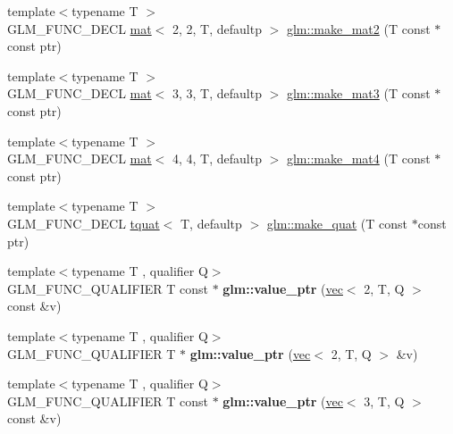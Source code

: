 \begin{DoxyCompactItemize}
\item 
{\footnotesize template$<$typename T $>$ }\\G\+L\+M\+\_\+\+F\+U\+N\+C\+\_\+\+D\+E\+CL \hyperlink{structglm_1_1mat}{mat}$<$ 2, 2, T, defaultp $>$ \hyperlink{group__gtc__type__ptr_ga04409e74dc3da251d2501acf5b4b546c}{glm\+::make\+\_\+mat2} (T const $\ast$const ptr)
\item 
{\footnotesize template$<$typename T $>$ }\\G\+L\+M\+\_\+\+F\+U\+N\+C\+\_\+\+D\+E\+CL \hyperlink{structglm_1_1mat}{mat}$<$ 3, 3, T, defaultp $>$ \hyperlink{group__gtc__type__ptr_ga611ee7c4d4cadfc83a8fa8e1d10a170f}{glm\+::make\+\_\+mat3} (T const $\ast$const ptr)
\item 
{\footnotesize template$<$typename T $>$ }\\G\+L\+M\+\_\+\+F\+U\+N\+C\+\_\+\+D\+E\+CL \hyperlink{structglm_1_1mat}{mat}$<$ 4, 4, T, defaultp $>$ \hyperlink{group__gtc__type__ptr_gae7bcedb710d1446c87fd1fc93ed8ee9a}{glm\+::make\+\_\+mat4} (T const $\ast$const ptr)
\item 
{\footnotesize template$<$typename T $>$ }\\G\+L\+M\+\_\+\+F\+U\+N\+C\+\_\+\+D\+E\+CL \hyperlink{structglm_1_1tquat}{tquat}$<$ T, defaultp $>$ \hyperlink{group__gtc__type__ptr_gaadafb6600af2633e4c98cc64c72f5269}{glm\+::make\+\_\+quat} (T const $\ast$const ptr)
\item 
\mbox{\label{group__gtc__type__ptr_gaa39964028a0cfbcd18549e33feea7357}} 
{\footnotesize template$<$typename T , qualifier Q$>$ }\\G\+L\+M\+\_\+\+F\+U\+N\+C\+\_\+\+Q\+U\+A\+L\+I\+F\+I\+ER T const  $\ast$ {\bfseries glm\+::value\+\_\+ptr} (\hyperlink{structglm_1_1vec}{vec}$<$ 2, T, Q $>$ const \&v)
\item 
\mbox{\label{group__gtc__type__ptr_ga54d4e779df698b9d951378dc0de5149d}} 
{\footnotesize template$<$typename T , qualifier Q$>$ }\\G\+L\+M\+\_\+\+F\+U\+N\+C\+\_\+\+Q\+U\+A\+L\+I\+F\+I\+ER T $\ast$ {\bfseries glm\+::value\+\_\+ptr} (\hyperlink{structglm_1_1vec}{vec}$<$ 2, T, Q $>$ \&v)
\item 
\mbox{\label{group__gtc__type__ptr_ga1b0d55a139927496b86be0e2948279a8}} 
{\footnotesize template$<$typename T , qualifier Q$>$ }\\G\+L\+M\+\_\+\+F\+U\+N\+C\+\_\+\+Q\+U\+A\+L\+I\+F\+I\+ER T const  $\ast$ {\bfseries glm\+::value\+\_\+ptr} (\hyperlink{structglm_1_1vec}{vec}$<$ 3, T, Q $>$ const \&v)

\end{DoxyCompactItemize}
